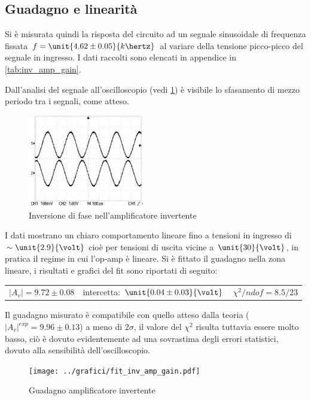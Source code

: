 \documentclass[10pt,a4paper]{article}
\begin{document}
\subsection{Guadagno e linearità}
Si è misurata quindi la risposta del circuito ad un segnale sinusoidale di frequenza fissata $f = \unit{4.62 \pm 0.05}{k\hertz}$ al variare della tensione picco-picco del segnale in ingresso. I dati raccolti sono elencati in appendice in \tablename{\ref{tab:inv_amp_gain}}.

Dall'analisi del segnale all'oscilloscopio (vedi \figurename{\ref{fig:inv_amp}}) è visibile lo sfasamento di mezzo periodo tra i segnali, come atteso.

\begin{figure}[H]
	\centering
	\includegraphics[width=0.45\textwidth]{../oscilloscopio/dinverting.jpg}
	\caption{Inversione di fase nell'amplificatore invertente}
	\label{fig:inv_amp}
\end{figure}

I dati mostrano un chiaro comportamento lineare fino a tensioni in ingresso di $\sim \unit{2.9}{\volt}$ cioè per tensioni di uscita vicine a $\unit{30}{\volt}$, in pratica il regime in cui l'op-amp è lineare. Si è fittato il guadagno nella zona lineare, i risultati e grafici del fit sono riportati di seguito:

\begin{table}[H]
	\centering
	\begin{tabular}{ccc}
		$|A_v| = 9.72 \pm 0.08$  & intercetta: $\unit{0.04 \pm 0.03}{\volt}$ & $\chi^2/ndof= 8.5 / 23$
	\end{tabular}
\end{table}
Il guadagno misurato è compatibile con quello atteso dalla teoria ($|A_v|^{exp} = 9.96 \pm 0.13$) a meno di $2\sigma$, il valore del $\chi^2$ risulta tuttavia essere molto basso, ciò è dovuto evidentemente ad una sovrastima degli errori statistici, dovuto alla sensibilità dell'oscilloscopio.
\begin{figure}[H]
	\centering
	\texttt{[image: ../grafici/fit\_inv\_amp\_gain.pdf]}
	\caption{Guadagno amplificatore invertente}
	\label{fig:inv_amp_gain}
\end{figure}
 
\end{document}
